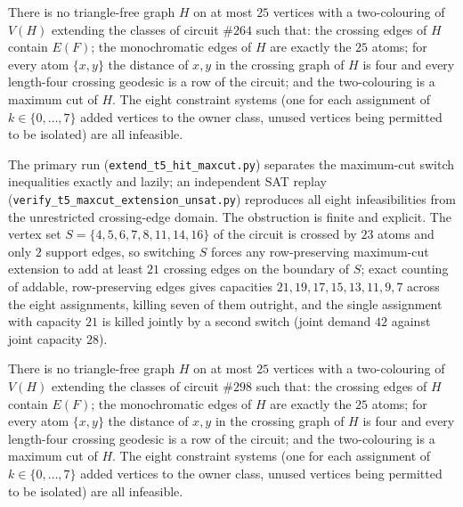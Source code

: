 \begin{proposition}\label{prop:extension}
There is no triangle-free graph \(H\) on at most \(25\) vertices with
a two-colouring of \(V(H)\) extending the classes of circuit
\(\#264\) such that: the crossing edges of \(H\) contain \(E(F)\); the
monochromatic edges of \(H\) are exactly the \(25\) atoms; for every
atom \(\{x,y\}\) the distance of \(x,y\) in the crossing graph of
\(H\) is four and every length-four crossing geodesic is a row of the
circuit; and the two-colouring is a maximum cut of \(H\). The eight
constraint systems (one for each assignment of \(k\in\{0,\dots,7\}\)
added vertices to the owner class, unused vertices being permitted to
be isolated) are all infeasible.
\end{proposition}

The primary run (\texttt{extend\_t5\_hit\_maxcut.py}) separates the
maximum-cut switch inequalities exactly and lazily; an independent SAT
replay (\texttt{verify\_t5\_maxcut\_extension\_unsat.py}) reproduces
all eight infeasibilities from the unrestricted crossing-edge domain.
The obstruction is finite and explicit. The vertex set
\(S=\{4,5,6,7,8,11,14,16\}\) of the circuit is crossed by \(23\)
atoms and only \(2\) support edges, so switching \(S\) forces any
row-preserving maximum-cut extension to add at least \(21\) crossing
edges on the boundary of \(S\); exact counting of addable,
row-preserving edges gives capacities
\(21,19,17,15,13,11,9,7\) across the eight assignments, killing seven
of them outright, and the single assignment with capacity \(21\) is
killed jointly by a second switch (joint demand \(42\) against joint
capacity \(28\)).

\begin{proposition}\label{prop:298extension}
There is no triangle-free graph \(H\) on at most \(25\) vertices with
a two-colouring of \(V(H)\) extending the classes of circuit
\(\#298\) such that: the crossing edges of \(H\) contain \(E(F)\); the
monochromatic edges of \(H\) are exactly the \(25\) atoms; for every
atom \(\{x,y\}\) the distance of \(x,y\) in the crossing graph of
\(H\) is four and every length-four crossing geodesic is a row of the
circuit; and the two-colouring is a maximum cut of \(H\). The eight
constraint systems (one for each assignment of \(k\in\{0,\dots,7\}\)
added vertices to the owner class, unused vertices being permitted to
be isolated) are all infeasible.
\end{proposition}

